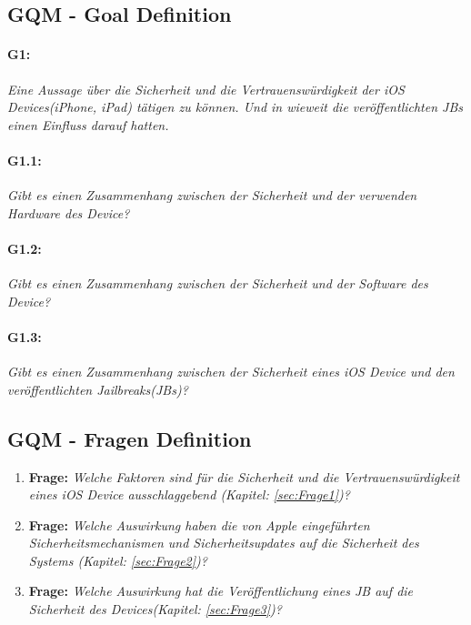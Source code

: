 \subsection{GQM - Goal Definition}
\label{sec:GQMGoal}

\paragraph{G1:} \textit{\glqq Eine Aussage über die Sicherheit und die Vertrauenswürdigkeit der iOS Devices(iPhone, iPad) tätigen zu können. Und in wieweit die veröffentlichten JBs einen Einfluss darauf hatten. \grqq{}}
\paragraph{G1.1:} \textit{\glqq Gibt es einen Zusammenhang zwischen der Sicherheit und der verwenden Hardware des Device?\grqq{}}
\paragraph{G1.2:} \textit{\glqq Gibt es einen Zusammenhang zwischen der Sicherheit und der Software des Device?\grqq{}}
\paragraph{G1.3:} \textit{\glqq Gibt es einen Zusammenhang zwischen der Sicherheit eines iOS Device und den veröffentlichten Jailbreaks(JBs)?\grqq{}}

\subsection{GQM - Fragen Definition}
\label{sec:GQMFragen}

\begin{enumerate}
    \item \label{frage:1} \textbf{Frage:} \textit{\glqq Welche Faktoren sind für die Sicherheit und die Vertrauenswürdigkeit eines iOS Device ausschlaggebend (Kapitel: \ref{sec:Frage1})?\grqq{}}
                    
    \item \label{frage:2}\textbf{Frage:} \textit{\glqq Welche Auswirkung haben die von Apple eingeführten Sicherheitsmechanismen und Sicherheitsupdates auf die Sicherheit des Systems (Kapitel: \ref{sec:Frage2})?\grqq{}}
            
    \item \label{frage:3}\textbf{Frage:} \textit{\glqq Welche Auswirkung hat die Veröffentlichung eines JB auf die Sicherheit des Devices(Kapitel: \ref{sec:Frage3})?\grqq{}}     
\end{enumerate}

